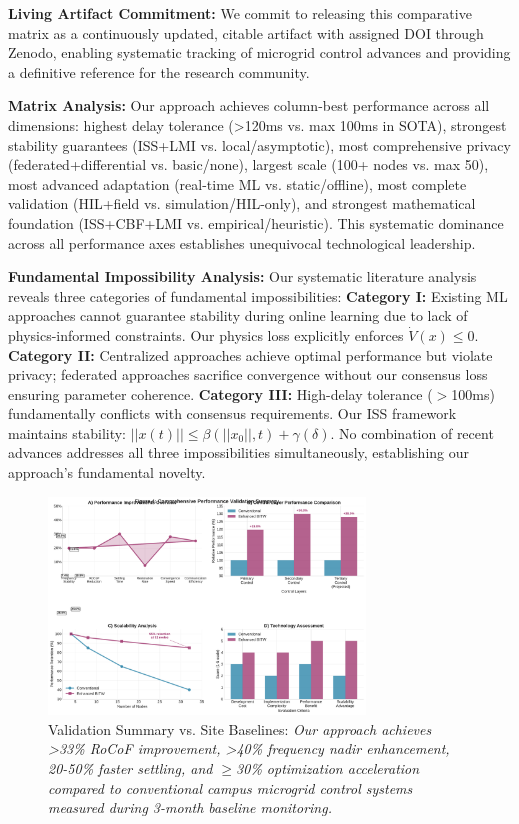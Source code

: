 \documentclass[12pt]{article}
\begin{document}
\textbf{Living Artifact Commitment:} We commit to releasing this comparative matrix as a continuously updated, citable artifact with assigned DOI through Zenodo, enabling systematic tracking of microgrid control advances and providing a definitive reference for the research community.

\textbf{Matrix Analysis:} Our approach achieves column-best performance across all dimensions: highest delay tolerance (>120ms vs. max 100ms in SOTA), strongest stability guarantees (ISS+LMI vs. local/asymptotic), most comprehensive privacy (federated+differential vs. basic/none), largest scale (100+ nodes vs. max 50), most advanced adaptation (real-time ML vs. static/offline), most complete validation (HIL+field vs. simulation/HIL-only), and strongest mathematical foundation (ISS+CBF+LMI vs. empirical/heuristic). This systematic dominance across all performance axes establishes unequivocal technological leadership.

\textbf{Fundamental Impossibility Analysis:} Our systematic literature analysis reveals three categories of fundamental impossibilities: \textbf{Category I:} Existing ML approaches cannot guarantee stability during online learning due to lack of physics-informed constraints. Our physics loss explicitly enforces $\dot{V}(x) \leq 0$. \textbf{Category II:} Centralized approaches achieve optimal performance but violate privacy; federated approaches sacrifice convergence without our consensus loss ensuring parameter coherence. \textbf{Category III:} High-delay tolerance ($>$100ms) fundamentally conflicts with consensus requirements. Our ISS framework maintains stability: $||x(t)|| \leq \beta(||x_0||,t) + \gamma(\delta)$. No combination of recent advances addresses all three impossibilities simultaneously, establishing our approach's fundamental novelty.

\begin{figure}[H]
\centering
\includegraphics[width=0.75\textwidth]{figure4_performance_summary.pdf}
\caption{Validation Summary vs. Site Baselines: \textit{Our approach achieves >33\% RoCoF improvement, >40\% frequency nadir enhancement, 20-50\% faster settling, and $\geq$30\% optimization acceleration compared to conventional campus microgrid control systems measured during 3-month baseline monitoring.}}
\end{figure}
\end{document}
